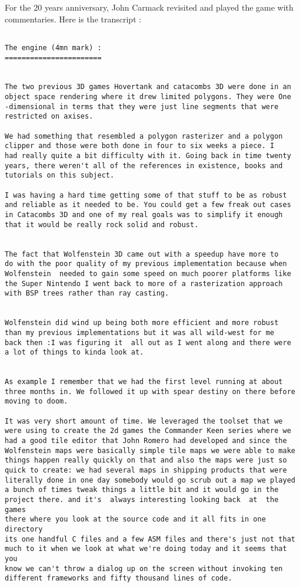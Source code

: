 \documentclass[book.tex]{subfiles}
\begin{document}
For the 20 years anniversary, John Carmack revisited and played the game with commentaries. Here is the transcript :

\begin{breakable_box}
   \begin{verbatim}
   
The engine (4mn mark) :
=======================


The two previous 3D games Hovertank and catacombs 3D were done in an 
object space rendering where it drew limited polygons. They were One
-dimensional in terms that they were just line segments that were 
restricted on axises.

We had something that resembled a polygon rasterizer and a polygon 
clipper and those were both done in four to six weeks a piece. I 
had really quite a bit difficulty with it. Going back in time twenty
years, there weren't all of the references in existence, books and 
tutorials on this subject.

I was having a hard time getting some of that stuff to be as robust
and reliable as it needed to be. You could get a few freak out cases
in Catacombs 3D and one of my real goals was to simplify it enough
that it would be really rock solid and robust.


The fact that Wolfenstein 3D came out with a speedup have more to 
do with the poor quality of my previous implementation because when 
Wolfenstein  needed to gain some speed on much poorer platforms like
the Super Nintendo I went back to more of a rasterization approach 
with BSP trees rather than ray casting.


Wolfenstein did wind up being both more efficient and more robust 
than my previous implementations but it was all wild-west for me 
back then :I was figuring it  all out as I went along and there were
a lot of things to kinda look at.


As example I remember that we had the first level running at about
three months in. We followed it up with spear destiny on there before
moving to doom.

It was very short amount of time. We leveraged the toolset that we 
were using to create the 2d games the Commander Keen series where we 
had a good tile editor that John Romero had developed and since the 
Wolfenstein maps were basically simple tile maps we were able to make 
things happen really quickly on that and also the maps were just so 
quick to create: we had several maps in shipping products that were 
literally done in one day somebody would go scrub out a map we played 
a bunch of times tweak things a little bit and it would go in the 
project there. and it's  always interesting looking back  at  the games 
there where you look at the source code and it all fits in one directory 
its one handful C files and a few ASM files and there's just not that 
much to it when we look at what we're doing today and it seems that you 
know we can't throw a dialog up on the screen without invoking ten 
different frameworks and fifty thousand lines of code.




\end{verbatim}
\end{breakable_box}
\end{document}

